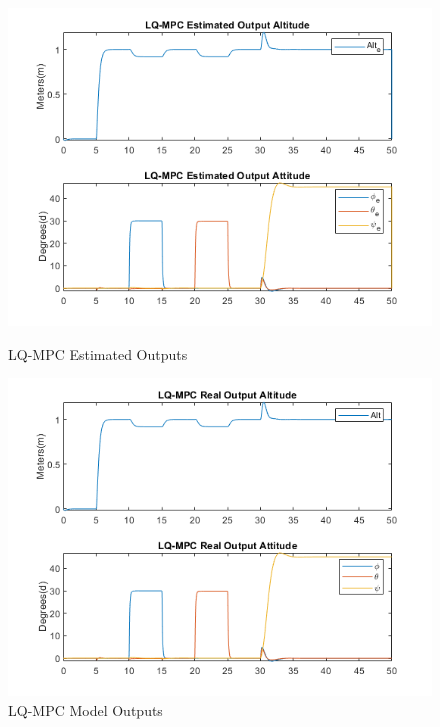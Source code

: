 \documentclass[12pt,a4paper,twoside]{report}
\begin{document}
				\begin{figure}[h!]
					\centering
					\begin{minipage}{0.5\textwidth}
						\centering
						\includegraphics[width=1\textwidth]{LQMPCestOutputs.png}
						\caption{LQ-MPC Estimated Outputs}
						\label{fig:lqmpcestimatedoutputs}
					\end{minipage}\hfill
					\begin{minipage}{0.5\textwidth}
						\centering
						\includegraphics[width=1\textwidth]{LQMPCrealOutputs.png}
						\caption{LQ-MPC Model Outputs}
						\label{fig:lqmpcrealoutputs}
					\end{minipage}
				\end{figure}
			
\end{document}
